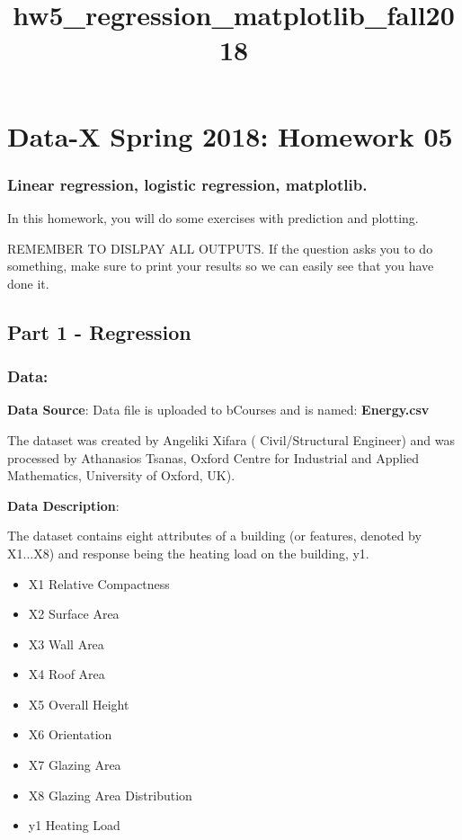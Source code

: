 \documentclass[11pt]{article}
\title{hw5\_regression\_matplotlib\_fall2018}
\providecommand{\tightlist}{%
      \setlength{\itemsep}{0pt}\setlength{\parskip}{0pt}}
\begin{document}
    
    
    \maketitle
    
    

    
    \section{Data-X Spring 2018: Homework
05}\label{data-x-spring-2018-homework-05}

\subsubsection{Linear regression, logistic regression,
matplotlib.}\label{linear-regression-logistic-regression-matplotlib.}

In this homework, you will do some exercises with prediction and
plotting.

REMEMBER TO DISLPAY ALL OUTPUTS. If the question asks you to do
something, make sure to print your results so we can easily see that you
have done it.

    \subsection{Part 1 - Regression}\label{part-1---regression}

    \subsubsection{Data:}\label{data}

\textbf{Data Source}: Data file is uploaded to bCourses and is named:
\textbf{Energy.csv}

The dataset was created by Angeliki Xifara ( Civil/Structural Engineer)
and was processed by Athanasios Tsanas, Oxford Centre for Industrial and
Applied Mathematics, University of Oxford, UK).

\textbf{Data Description}:

The dataset contains eight attributes of a building (or features,
denoted by X1...X8) and response being the heating load on the building,
y1.

\begin{itemize}
\tightlist
\item
  X1 Relative Compactness
\item
  X2 Surface Area
\item
  X3 Wall Area
\item
  X4 Roof Area
\item
  X5 Overall Height
\item
  X6 Orientation
\item
  X7 Glazing Area
\item
  X8 Glazing Area Distribution
\item
  y1 Heating Load
\end{itemize}
\end{document}
